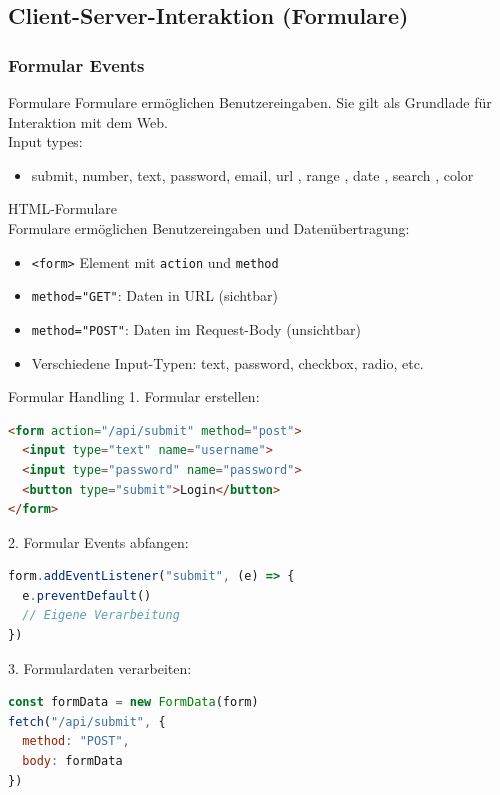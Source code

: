 \pagebreak

\subsection{Client-Server-Interaktion (Formulare)}

\subsubsection{Formular Events}

\begin{definition}{Formulare}
Formulare ermöglichen Benutzereingaben. Sie gilt als Grundlade für Interaktion mit dem Web.\\
Input types:

\begin{itemize}
\item submit, number, text, password, email, url , range , date , search , color
\end{itemize}
\end{definition}



\begin{definition}{HTML-Formulare}\\
    Formulare ermöglichen Benutzereingaben und Datenübertragung:
    \begin{itemize}
        \item \texttt{<form>} Element mit \texttt{action} und \texttt{method}
        \item \texttt{method="GET"}: Daten in URL (sichtbar)
        \item \texttt{method="POST"}: Daten im Request-Body (unsichtbar)
        \item Verschiedene Input-Typen: text, password, checkbox, radio, etc.
    \end{itemize}
\end{definition}

\begin{KR}{Formular Handling}
1. Formular erstellen:
\begin{lstlisting}[language=HTML, style=basesmol]
<form action="/api/submit" method="post">
  <input type="text" name="username">
  <input type="password" name="password">
  <button type="submit">Login</button>
</form>
\end{lstlisting}

2. Formular Events abfangen:
\begin{lstlisting}[language=JavaScript, style=basesmol]
form.addEventListener("submit", (e) => {
  e.preventDefault() 
  // Eigene Verarbeitung
})
\end{lstlisting}

3. Formulardaten verarbeiten:
\begin{lstlisting}[language=JavaScript, style=basesmol]
const formData = new FormData(form)
fetch("/api/submit", {
  method: "POST",
  body: formData
})
\end{lstlisting}
\end{KR}

